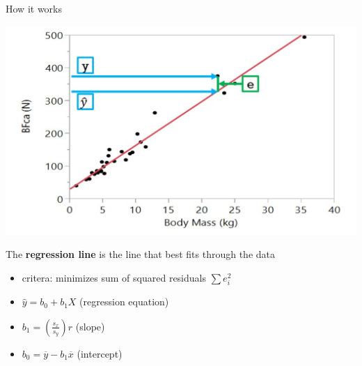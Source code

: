 \documentclass{beamer}
\begin{document}
\begin{frame}{How it works}
\begin{center}
    \includegraphics[scale=.3]{bite_force_regression_example.jpg}
\end{center}

The \textbf{regression line} is the line that best fits through the data
\begin{itemize}
    \item critera: minimizes sum of squared residuals $\sum e_i^2$
    \item $\hat{y} = b_0 + b_1X$ \hspace{2mm}(regression equation)
    \item $b_1 = (\frac{s_x}{s_y})r$ \hspace{2mm} (slope)
    \item $b_0 = \overline{y}-b_1 \overline{x}$ \hspace{2mm} (intercept)
\end{itemize}
\end{frame}
\end{document}
